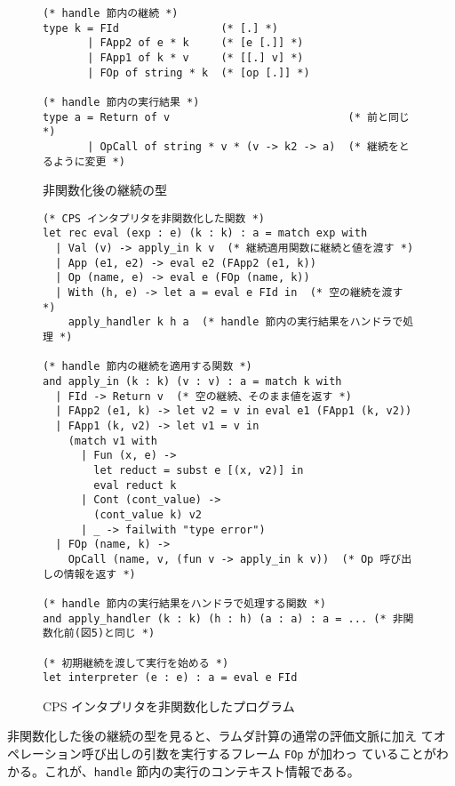 \begin{figure}
\begin{spacing}{0.9}
\begin{verbatim}
(* handle 節内の継続 *)
type k = FId                (* [.] *)
       | FApp2 of e * k     (* [e [.]] *)
       | FApp1 of k * v     (* [[.] v] *)
       | FOp of string * k  (* [op [.]] *)

(* handle 節内の実行結果 *)
type a = Return of v                            (* 前と同じ *)
       | OpCall of string * v * (v -> k2 -> a)  (* 継続をとるように変更 *)
\end{verbatim}
\caption{非関数化後の継続の型}
\label{figure:k_2defun}
\end{spacing}
\end{figure}

\begin{figure}[t]
\begin{spacing}{0.9}
\begin{verbatim}
(* CPS インタプリタを非関数化した関数 *)
let rec eval (exp : e) (k : k) : a = match exp with
  | Val (v) -> apply_in k v  (* 継続適用関数に継続と値を渡す *)
  | App (e1, e2) -> eval e2 (FApp2 (e1, k))
  | Op (name, e) -> eval e (FOp (name, k))
  | With (h, e) -> let a = eval e FId in  (* 空の継続を渡す *)
    apply_handler k h a  (* handle 節内の実行結果をハンドラで処理 *)

(* handle 節内の継続を適用する関数 *)
and apply_in (k : k) (v : v) : a = match k with
  | FId -> Return v  (* 空の継続、そのまま値を返す *)
  | FApp2 (e1, k) -> let v2 = v in eval e1 (FApp1 (k, v2))
  | FApp1 (k, v2) -> let v1 = v in
    (match v1 with
      | Fun (x, e) ->
        let reduct = subst e [(x, v2)] in
        eval reduct k
      | Cont (cont_value) ->
        (cont_value k) v2
      | _ -> failwith "type error")
  | FOp (name, k) ->
    OpCall (name, v, (fun v -> apply_in k v))  (* Op 呼び出しの情報を返す *)

(* handle 節内の実行結果をハンドラで処理する関数 *)
and apply_handler (k : k) (h : h) (a : a) : a = ... (* 非関数化前(図5)と同じ *)

(* 初期継続を渡して実行を始める *)
let interpreter (e : e) : a = eval e FId
\end{verbatim}
\caption{CPS インタプリタを非関数化したプログラム}
\label{figure:2defun}
\end{spacing}
\end{figure}

非関数化した後の継続の型を見ると、ラムダ計算の通常の評価文脈に加え
てオペレーション呼び出しの引数を実行するフレーム \texttt{FOp} が加わっ
ていることがわかる。これが、\texttt{handle} 節内の実行のコンテキスト情報である。

